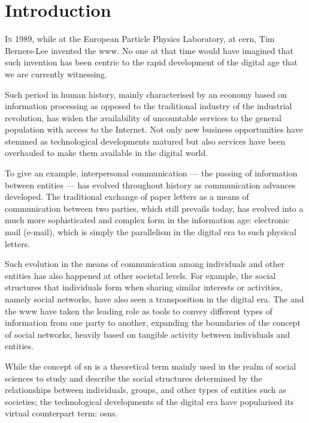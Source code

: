 \documentclass[showtrims]{kthesis}
\begin{document}
\mainmatter

\chapter{Introduction}
\lettrine{\textcolor[gray]{.25}{I}}{n} 1989, while at the European Particle Physics Laboratory, at \ac{cern}, Tim Berners-Lee 
invented the \Ac{www}. No one at that time would have imagined that such invention 
has been centric to the rapid development of the digital age that we are currently 
witnessing.

Such period in human history, mainly characterised by an economy based on information 
processing as opposed to the traditional industry of the industrial revolution, 
has widen the availability of uncountable services to the general population with 
access to the Internet. Not only new business opportunities have stemmed as technological 
developments matured but also services have been overhauled to make them available 
in the digital world.

To give an example, interpersonal communication --- the passing of information between 
entities --- has evolved throughout history as communication advances developed. 
The traditional exchange of paper letters as a means of communication between two 
parties, which still prevails today, has evolved into a much more sophisticated 
and complex form in the information age: electronic mail (e-mail), which is simply 
the parallelism in the digital era to such physical letters.

Such evolution in the means of communication among individuals and other entities 
has also happened at other societal levels. For example, the social structures that 
individuals form when sharing similar interests or activities, namely social networks, 
have also seen a transposition in the digital era. The \Internet and the \ac{www} 
have taken the leading role as tools to convey different types of information from 
one party to another, expanding the boundaries of the concept of social networks, 
heavily based on tangible activity between individuals and entities.

While the concept of \acl{sn} is a theoretical term mainly used in the realm of 
social sciences to study and describe the social structures determined by the relationships 
between individuals, groups, and other types of entities such as societies; the 
technological developments of the digital era have popularised its virtual counterpart 
term: \aclp{osn}.
\end{document}
